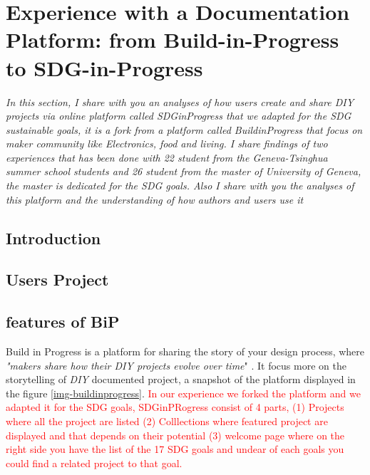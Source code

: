 \chapter{Experience with a Documentation Platform: from Build-in-Progress to SDG-in-Progress}


\begin{center}
	\begin{minipage}{.7\textwidth}
		\textit{In this section, I share with you an analyses of how users create and share \textit{DIY} projects via online platform called \textit{SDGinProgress} that we adapted for the SDG sustainable goals, it is a fork from a platform called \textit{BuildinProgress} that focus on maker community like Electronics, food and living. I share findings of two experiences that has been done with 22 student from the Geneva-Tsinghua summer school students and 26 student from the master of University of Geneva, the master is dedicated for the SDG goals. Also I share with you the analyses of this platform and the understanding of how authors and users use it}
	\end{minipage}
\end{center}
\section{Introduction}

\section{Users Project}

\section{features of BiP}

Build in Progress is a platform for sharing the story of your design process, where \textit{"makers share how their DIY projects evolve over time}" \cite{tseng2016making}. It focus more on the storytelling of \textit{DIY} documented project, a snapshot of the platform displayed in the figure \ref{img-buildinprogress}. \textcolor{red}{In our experience we forked the platform and we adapted it for the SDG goals, SDGinPRogress consist of 4 parts, (1) Projects where all the project are listed (2) Colllections where featured project are displayed and that depends on their potential (3) welcome page where on the right side you have the list of the 17 SDG goals and undear of each goals you could find a related project to that goal.}

